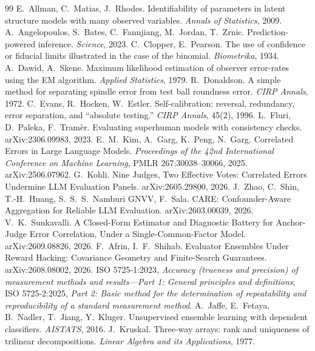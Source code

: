 \documentclass[11pt]{article}
\theoremstyle{definition}
\theoremstyle{remark}
\begin{document}
\begin{thebibliography}{99}\footnotesize\setlength{\itemsep}{0pt}
 E.~Allman, C.~Matias, J.~Rhodes. Identifiability of parameters in latent structure models with many observed variables. \emph{Annals of Statistics}, 2009.
 A.~Angelopoulos, S.~Bates, C.~Fannjiang, M.~Jordan, T.~Zrnic. Prediction-powered inference. \emph{Science}, 2023.
 C.~Clopper, E.~Pearson. The use of confidence or fiducial limits illustrated in the case of the binomial. \emph{Biometrika}, 1934.
 A.~Dawid, A.~Skene. Maximum likelihood estimation of observer error-rates using the EM algorithm. \emph{Applied Statistics}, 1979.
 R.~Donaldson. A simple method for separating spindle error from test ball roundness error. \emph{CIRP Annals}, 1972.
 C.~Evans, R.~Hocken, W.~Estler. Self-calibration: reversal, redundancy, error separation, and ``absolute testing.'' \emph{CIRP Annals}, 45(2), 1996.
 L.~Fluri, D.~Paleka, F.~Tram\`er. Evaluating superhuman models with consistency checks. arXiv:2306.09983, 2023.
 E.~M.~Kim, A.~Garg, K.~Peng, N.~Garg. Correlated Errors in Large Language Models. \emph{Proceedings of the 42nd International Conference on Machine Learning}, PMLR 267:30038--30066, 2025. arXiv:2506.07962.
 G.~Kohli. Nine Judges, Two Effective Votes: Correlated Errors Undermine LLM Evaluation Panels. arXiv:2605.29800, 2026.
 J.~Zhao, C.~Shin, T.-H.~Huang, S.~S.~S.~Namburi GNVV, F.~Sala. CARE: Confounder-Aware Aggregation for Reliable LLM Evaluation. arXiv:2603.00039, 2026.
 V.~K.~Sunkavalli. A Closed-Form Estimator and Diagnostic Battery for Anchor-Judge Error Correlation, Under a Single-Common-Factor Model. arXiv:2609.08826, 2026.
 F.~Afrin, I.~F.~Shihab. Evaluator Ensembles Under Reward Hacking: Covariance Geometry and Finite-Search Guarantees. arXiv:2608.08002, 2026.
 ISO 5725-1:2023, \emph{Accuracy (trueness and precision) of measurement methods and results---Part 1: General principles and definitions}; ISO 5725-2:2025, \emph{Part 2: Basic method for the determination of repeatability and reproducibility of a standard measurement method}.
 A.~Jaffe, E.~Fetaya, B.~Nadler, T.~Jiang, Y.~Kluger. Unsupervised ensemble learning with dependent classifiers. \emph{AISTATS}, 2016.
 J.~Kruskal. Three-way arrays: rank and uniqueness of trilinear decompositions. \emph{Linear Algebra and its Applications}, 1977.

\end{thebibliography}
\end{document}
